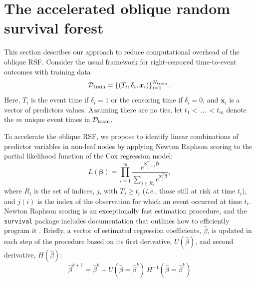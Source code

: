 \documentclass{article}\usepackage[]{graphicx}\usepackage[]{xcolor}
\newcommand{\dataset}{{\cal D}}
\newcommand{\ie}{\textit{i.e.}}
\begin{document}


\section{The accelerated oblique random survival forest} \label{sec:aorsf}

This section describes our approach to reduce computational overhead of the oblique RSF. Consider the usual framework for right-censored time-to-event outcomes with training data $$\dataset_{\text{train}} = \left\{ (T_i, \delta_i, \bm{x}_{i}) \right\}_{i=1}^{N_{\text{train}}}.$$ Here, $T_i$ is the event time if $\delta_i=1$ or the censoring time if $\delta_i=0$, and $\bm{x}_i$ is a vector of predictors values. Assuming there are no ties, let $t_1 < \, \ldots \, < t_m$ denote the $m$ unique event times in $\dataset_{\text{train}}$.

To accelerate the oblique RSF, we propose to identify linear combinations of predictor variables in non-leaf nodes by applying Newton Raphson scoring to the partial likelihood function of the Cox regression model:
\begin{equation}\label{eqn:cox-partial-likelihood}
L(\bm\beta) = \prod_{i=1}^m \frac{e^{\bm{x}_{j(i)}^T \bm\beta}}{\sum_{j \in R_i} e^{\bm{x}_j^T \bm\beta}},
\end{equation}
where $R_i$ is the set of indices, $j$, with $T_j \geq t_i$ (\ie, those still at risk at time $t_i$), and $j(i)$ is the index of the observation for which an event occurred at time $t_i$. Newton Raphson scoring is an exceptionally fast estimation procedure, and the \texttt{survival} package \citep{survival} includes documentation that outlines how to efficiently program it \citep{therneau_survival_2022}. Briefly, a vector of estimated regression coefficients, $\hat{\beta}$, is updated in each step of the procedure based on its first derivative, $U(\hat{\beta})$, and second derivative, $H(\hat{\beta})$:
$$ \hat{\beta}^{k+1} =  \hat{\beta}^{k} + U(\hat{\beta} = \hat{\beta}^{k})\, H^{-1}(\hat{\beta} = \hat{\beta}^{k}) $$
\end{document}
